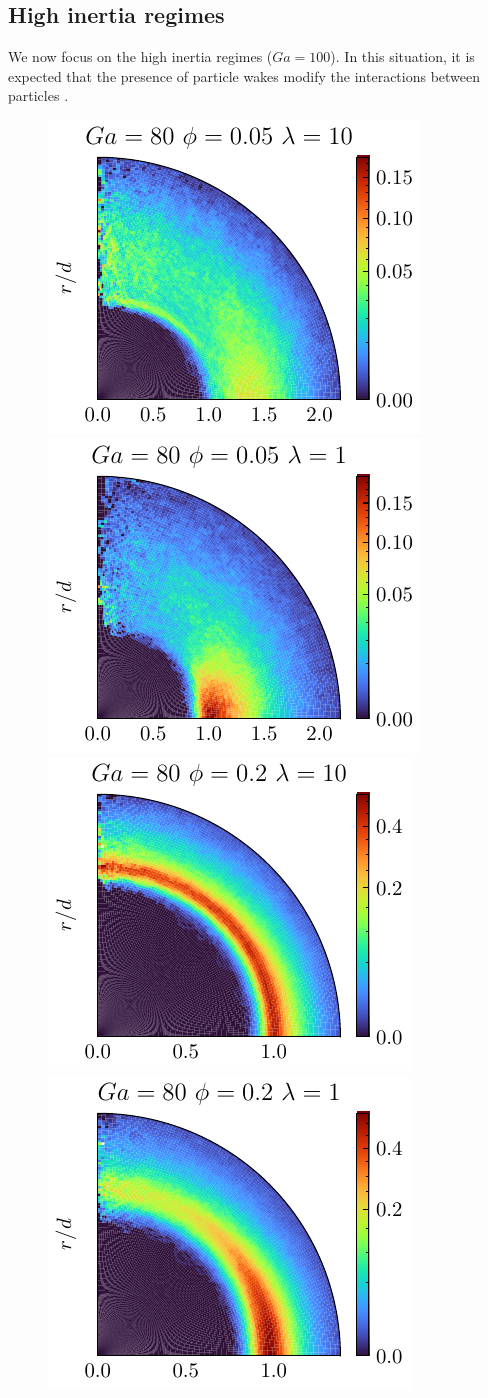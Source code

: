 \documentclass[11pt]{My_preprint}
\providecommand{\DIFadd}[1]{{\protect\color{blue}\uwave{#1}}} %
\providecommand{\DIFdel}[1]{{\protect\color{red}\sout{#1}}}                      %
\providecommand{\DIFaddbegin}{} %
\providecommand{\DIFaddend}{} %
\providecommand{\DIFdelbegin}{} %
\providecommand{\DIFdelend}{} %
\providecommand{\DIFaddbeginFL}{} %
\providecommand{\DIFdelbeginFL}{} %
\providecommand{\DIFdelendFL}{} %
\begin{document}
 \subsection{High inertia regimes }
We now focus on the high inertia regimes (\DIFdelbegin \DIFdel{$Ga =100$}\DIFdelend \DIFaddbegin \DIFadd{$Ga =80$}\DIFaddend ).
In this situation, it is expected that the presence of particle wakes modify the interactions between particles \citep{yin2007}. 
\begin{figure}[h!]
    \centering
    \DIFdelbeginFL %
\DIFdelendFL \DIFaddbeginFL \includegraphics[height=0.205\textwidth]{image/HOMOGENEOUS_final/Dist/Pnst_l_10_Ga_80_PHI_0_05.pdf}
    \includegraphics[height=0.205\textwidth]{image/HOMOGENEOUS_final/Dist/Pnst_l_1_Ga_80_PHI_0_05.pdf}
    \includegraphics[height=0.205\textwidth]{image/HOMOGENEOUS_final/Dist/Pnst_l_10_Ga_80_PHI_0_2.pdf}
    \includegraphics[height=0.205\textwidth]{image/HOMOGENEOUS_final/Dist/Pnst_l_1_Ga_80_PHI_0_2.pdf}

\end{figure}
\end{document}
